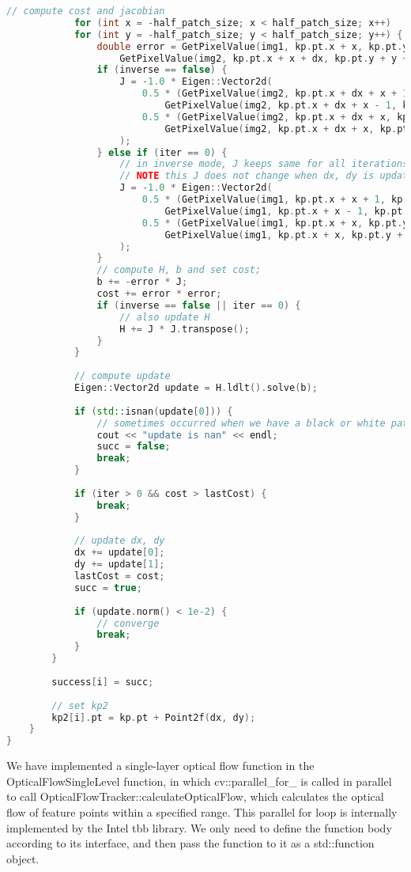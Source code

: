 {\begin{lstlisting}[language=c++,caption=slambook2/ch8/optical_flow.cpp (snippet))]
			// compute cost and jacobian
			for (int x = -half_patch_size; x < half_patch_size; x++)
			for (int y = -half_patch_size; y < half_patch_size; y++) {
				double error = GetPixelValue(img1, kp.pt.x + x, kp.pt.y + y) -
					GetPixelValue(img2, kp.pt.x + x + dx, kp.pt.y + y + dy);;  // Jacobian
				if (inverse == false) {
					J = -1.0 * Eigen::Vector2d(
						0.5 * (GetPixelValue(img2, kp.pt.x + dx + x + 1, kp.pt.y + dy + y) -
							GetPixelValue(img2, kp.pt.x + dx + x - 1, kp.pt.y + dy + y)),
						0.5 * (GetPixelValue(img2, kp.pt.x + dx + x, kp.pt.y + dy + y + 1) -
							GetPixelValue(img2, kp.pt.x + dx + x, kp.pt.y + dy + y - 1))
					);
				} else if (iter == 0) {
					// in inverse mode, J keeps same for all iterations
					// NOTE this J does not change when dx, dy is updated, so we can store it and only compute error
					J = -1.0 * Eigen::Vector2d(
						0.5 * (GetPixelValue(img1, kp.pt.x + x + 1, kp.pt.y + y) -
							GetPixelValue(img1, kp.pt.x + x - 1, kp.pt.y + y)),
						0.5 * (GetPixelValue(img1, kp.pt.x + x, kp.pt.y + y + 1) -
							GetPixelValue(img1, kp.pt.x + x, kp.pt.y + y - 1))
					);
				}
				// compute H, b and set cost;
				b += -error * J;
				cost += error * error;
				if (inverse == false || iter == 0) {
					// also update H
					H += J * J.transpose();
				}
			}
			
			// compute update
			Eigen::Vector2d update = H.ldlt().solve(b);
			
			if (std::isnan(update[0])) {
				// sometimes occurred when we have a black or white patch and H is irreversible
				cout << "update is nan" << endl;
				succ = false;
				break;
			}
			
			if (iter > 0 && cost > lastCost) {
				break;
			}
			
			// update dx, dy
			dx += update[0];
			dy += update[1];
			lastCost = cost;
			succ = true;
			
			if (update.norm() < 1e-2) {
				// converge
				break;
			}
		}
		
		success[i] = succ;
		
		// set kp2
		kp2[i].pt = kp.pt + Point2f(dx, dy);
	}
}
\end{lstlisting}

We have implemented a single-layer optical flow function in the OpticalFlowSingleLevel function, in which cv::parallel\_for\_ is called in parallel to call OpticalFlowTracker::calculateOpticalFlow, which calculates the optical flow of feature points within a specified range. This parallel for loop is internally implemented by the Intel tbb library. We only need to define the function body according to its interface, and then pass the function to it as a std::function object.

}
